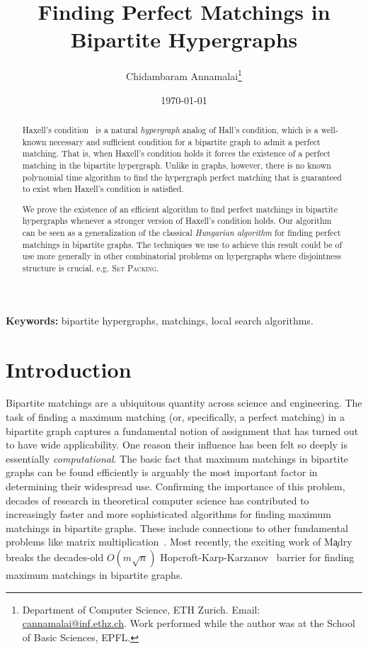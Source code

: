 \documentclass[11pt]{article}
\title{Finding Perfect Matchings in Bipartite Hypergraphs}
\author{Chidambaram Annamalai\thanks{Department of Computer Science,
    ETH Zurich. Email:
\href{mailto:cannamalai@inf.ethz.ch}{cannamalai@inf.ethz.ch}. \newline Work performed while the author was at the School of Basic Sciences, EPFL.}}
\date{\today}
\theoremstyle{definition}
\theoremstyle{remark}
\newcommand{\problemmacro}[1]{\texorpdfstring{\textsc{#1}}{#1}\xspace}
\newcommand{\draftbox}{\begin{center}
  \fbox{\begin{minipage}{2in}\begin{center}\Large\textsc{Working Draft}\\Please do not distribute\end{center}\end{minipage}}\end{center}
\vspace{0.2cm}}
\newcommand{\draftbox}{}
\begin{document}
\maketitle
\draftbox
\thispagestyle{empty}

\begin{abstract}
  Haxell's condition~\cite{haxell1995condition} is a natural \emph{hypergraph} analog of Hall's condition, which is a well-known necessary and sufficient condition for a bipartite graph to admit a perfect matching. That is, when Haxell's condition holds it forces the existence of a perfect matching in the bipartite hypergraph. Unlike in graphs, however, there is no known polynomial time algorithm to find the hypergraph perfect matching that is guaranteed to exist when Haxell's condition is satisfied.

We prove the existence of an efficient algorithm to find perfect matchings in bipartite hypergraphs whenever a stronger version of Haxell's condition holds. Our algorithm can be seen as a generalization of the classical \emph{Hungarian algorithm} for finding perfect matchings in bipartite graphs. The techniques we use to achieve this result could be of use more generally in other combinatorial problems on hypergraphs where disjointness structure is crucial, e.g. \problemmacro{Set Packing}.

 \end{abstract}

\medskip
\noindent
{\small \textbf{Keywords:}
bipartite hypergraphs, matchings, local search algorithms.
}

\newpage
\section{Introduction}
Bipartite matchings are a ubiquitous quantity across science and
engineering. The task of finding a maximum matching (or, specifically,
a perfect matching) in a bipartite graph captures a fundamental notion
of assignment that has turned out to have wide applicability. One
reason their influence has been felt so deeply is essentially
\emph{computational}. The basic fact that maximum matchings in
bipartite graphs can be found efficiently is arguably the most
important factor in determining their widespread use. Confirming the
importance of this problem, decades of research in theoretical
computer science has contributed to increasingly faster and more
sophisticated algorithms for finding maximum matchings in bipartite
graphs. These include connections to other fundamental problems like
matrix
multiplication~\cite{lovasz1979determinants,mucha2004maximum}. Most
recently, the exciting work of M\c{a}dry~\cite{madry2013navigating} breaks
the decades-old $O(m\sqrt{n})$
Hopcroft-Karp-Karzanov~\cite{hopcroft1973n,karzanov1973nakhozhdenii}
barrier for finding maximum matchings in bipartite graphs.
\end{document}
